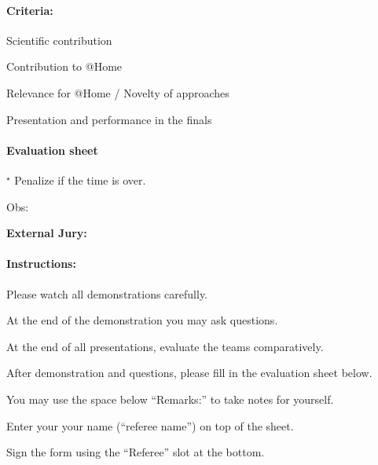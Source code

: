 \paragraph{Criteria:}
\begin{compactitem}
\item Scientific contribution
\item Contribution to @Home
\item Relevance for @Home / Novelty of approaches
\item Presentation and performance in the finals
\end{compactitem}



\paragraph{Evaluation sheet}
\begin{center}

${}^\star$ Penalize if the time is over.
\end{center}

Obs:


\clearpage
\begin{center}
\textbf{External Jury:}
\end{center} 

\paragraph{Instructions:}
\begin{compactenum}
\item Please watch all demonstrations carefully.
\item At the end of the demonstration you may ask questions.
\item At the end of all presentations, evaluate the teams comparatively.
\item After demonstration and questions, please fill in the evaluation sheet below.
\item You may use the space below \enquote{Remarks:} to take notes for yourself.
\item Enter your your name (\enquote{referee name}) on top of the sheet.
\item Sign the form using the \enquote{Referee} slot at the bottom.
\end{compactenum}


